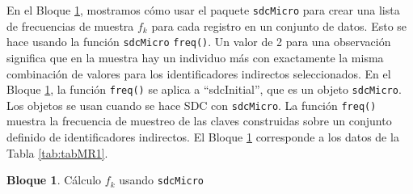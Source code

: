 \documentclass[
]{book}
\theoremstyle{definition}
\theoremstyle{definition}
\newtheorem{example}{Bloque}[chapter]
\theoremstyle{definition}
\theoremstyle{definition}
\theoremstyle{remark}
\begin{document}
En el Bloque \ref{exm:bloqueMR1}, mostramos cómo usar el paquete \texttt{sdcMicro} para crear una lista de frecuencias de muestra \(f_{k}\) para cada registro en un conjunto de datos. Esto se hace usando la función \texttt{sdcMicro} \texttt{freq()}. Un valor de 2 para una observación significa que en la muestra hay un individuo más con exactamente la misma combinación de valores para los identificadores indirectos seleccionados. En el Bloque \ref{exm:bloqueMR1}, la función \texttt{freq()} se aplica a ``sdcInitial'', que es un objeto \texttt{sdcMicro}. Los objetos se usan cuando se hace SDC con \texttt{sdcMicro}. La función \texttt{freq()} muestra la frecuencia de muestreo de las claves construidas sobre un conjunto definido de identificadores indirectos. El Bloque \ref{exm:bloqueMR1} corresponde a los datos de la Tabla \ref{tab:tabMR1}.

\begin{example}
\protect\hypertarget{exm:bloqueMR1}{}\label{exm:bloqueMR1}Cálculo \(f_{k}\) usando \texttt{sdcMicro}
\end{example}
\end{document}
